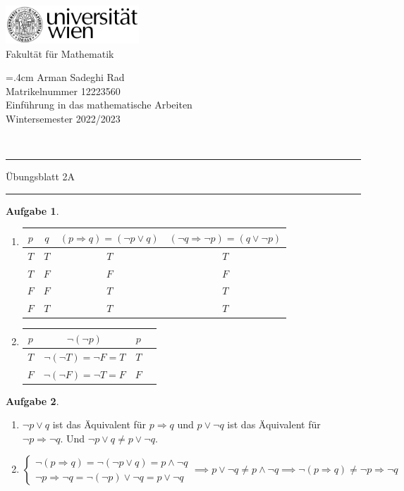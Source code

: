 \documentclass{article}
\theoremstyle{definition}
\newtheorem{ub}{Aufgabe}
\begin{document}
	
	\thispagestyle{plain}
	\begin{minipage}{5cm}
		\includegraphics[width=5cm]{logo}\\
		\centering
		Fakultät für Mathematik
	\end{minipage}
	\hfill
	\begin{minipage}{7cm}
		\baselineskip=.4cm
		Arman Sadeghi Rad\\
		Matrikelnummer 12223560 \\
		Einführung in das mathematische Arbeiten \\
		Wintersemester 2022/2023
	\end{minipage}\\[1mm]
	\hrule height2pt \vskip1mm
	\noindent
	Übungsblatt 2A
	\hrule height2pt \vskip1mm
\begin{ub}\[  \]
	\begin{enumerate}
		\item 	\begin{tabular}{|c|c|c|c|}
			\hline
			$ p $ & $ q $ & $ (p \Rightarrow q) = (\neg p \lor q) $ & $ (\neg q \Rightarrow \neg p) = (q \lor \neg p) $ \\
			\hline
			$ T $ & $ T $ & $ T $ & $ T $ \\
			\hline
			$ T $ & $ F $ & $ F $ & $ F $ \\
			\hline
			$ F $ & $ F $ & $ T $ & $ T $ \\
			\hline
			$ F $ & $ T $ & $ T $ & $ T $ \\
			\hline
		\end{tabular}
		\item 	\begin{tabular}{|c|c|c|c|}
			\hline
			$ p $ & $ \neg (\neg p) $ & $ p $ \\
			\hline
			$ T $ & $ \neg(\neg T) = \neg F = T $ & $ T $ \\
			\hline
			$ F $ & $ \neg(\neg F) = \neg T = F $ & $ F $ \\
			\hline
		\end{tabular}
	\end{enumerate}
\end{ub}
\begin{ub}
	\begin{enumerate}
		\item $ \neg p \lor q $ ist das \"Aquivalent f\"ur $ p \Rightarrow q $ und $ p \lor \neg q $ ist das \"Aquivalent f\"ur $ \neg p \Rightarrow \neg q $. Und $ \neg p \lor q \neq p \lor \neg q $.
		\item 
		\[ 
		\left\{
		\begin{array}{l}
			\neg (p \Rightarrow q) = \neg (\neg p \lor q) = p \land \neg q \\
			\neg p \Rightarrow \neg q  = \neg(\neg p) \lor \neg q = p \lor \neg q
		\end{array} \implies p \lor \neg q \neq p \land \neg q \implies \neg (p \Rightarrow q) \neq \neg p \Rightarrow \neg q
		\right.
		 \] 
	\end{enumerate}
\end{ub}
\end{document}
